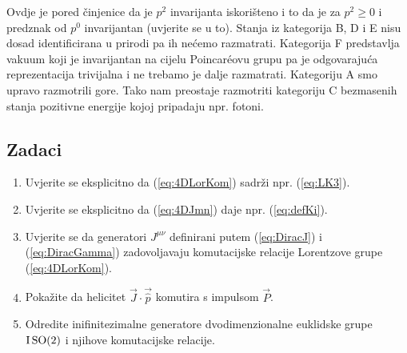 Ovdje je pored činjenice da je $p^2$ invarijanta iskorišteno i to da je
za $p^2 \ge 0$ i predznak od $p^0$ invarijantan (uvjerite se u to).
Stanja iz kategorija B, D i E nisu dosad identificirana u prirodi pa ih
nećemo razmatrati.
Kategorija F predstavlja vakuum koji je invarijantan na cijelu Poincar\'{e}ovu
grupu pa je odgovarajuća reprezentacija trivijalna i ne trebamo je
dalje razmatrati.
Kategoriju A smo upravo razmotrili gore.
Tako nam preostaje razmotriti kategoriju C bezmasenih stanja pozitivne
energije kojoj pripadaju npr. fotoni.

\subsection*{Zadaci}

\begin{enumerate}[label=\arabic{chapter}.\arabic*.]

\item Uvjerite se eksplicitno da (\ref{eq:4DLorKom}) sadrži npr. (\ref{eq:LK3}).

\item Uvjerite se eksplicitno da (\ref{eq:4DJmn}) daje npr. (\ref{eq:defKi}).

\item Uvjerite se da generatori $J^{\mu\nu}$ definirani putem
(\ref{eq:DiracJ}) i (\ref{eq:DiracGamma}) zadovoljavaju komutacijske
relacije Lorentzove grupe (\ref{eq:4DLorKom}).

\item Pokažite da helicitet $\vec{J}\cdot\vec{\hat{p}}$ komutira s impulsom $\vec{P}$.
    \label{zad:help}

\item Odredite inifinitezimalne generatore dvodimenzionalne euklidske
    grupe $\mathrm{I}\,\mathrm{SO}(2)$ i njihove komutacijske relacije.
\end{enumerate}
